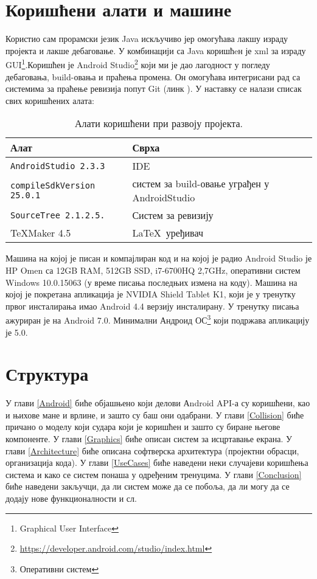 \section{Коришћени алати и машине}
Користио сам прорамски језик Java искључиво јер омогућава лакшу израду пројекта и лакше дебаговање. У комбинацији са Java коришћeн је xml за израду GUI\footnote{Graphical User Interface}.Коришћен је Android Studio\footnote{\url{https://developer.android.com/studio/index.html}} који ми је дао лагодност у погледу дебаговања, build-овања и праћења промена. Он омогућава интегрисани рад са системима за праћење ревизија попут Git (линк \cite{BitBucket}). У наставку се налази списак свих коришћених алата:
\begin{table}[H]\centering
\begin{tabular}{ l  l } \toprule
{\bf Алат} & {\bf Сврха}\\ \midrule
{\tt AndroidStudio 2.3.3} & IDE\\
{\tt compileSdkVersion 25.0.1} & систем за build-овање уграђен у AndroidStudio\\
{\tt SourceTree 2.1.2.5.} & Систем за ревизију\\
\TeX Maker 4.5 & \LaTeX\ уређивач\\
\bottomrule
\end{tabular}
\caption{Алати коришћени при развоју пројекта.} \label{UsedTools}
\end{table}
Машина на којој је писан и компајлиран код и на којој је радио Android Studio је HP Omen са 12GB RAM, 512GB SSD, i7-6700HQ 2,7GHz, оперативни систем Windows 10.0.15063 (у време писања последњих измена на коду). Машина на којој је покретана апликација је NVIDIA Shield Tablet K1, који је у тренутку првог инсталирања имао Android 4.4 верзију инсталирану. У тренутку писања ажуриран је на Android 7.0. Минимални Андроид ОС\footnote{Оперативни систем} који подржава апликацију је 5.0.


\section{Структура}
У глави \ref{Android} биће објашњено који делови Аndroid API-а су коришћени, као и њихове мане и врлине, и зашто су баш они одабрани.
У глави  \ref{Collision} биће причано о моделу који судара који је коришћен и зашто су биране његове компоненте. У глави \ref{Graphics} биће описан систем за исцртавање екрана. У глави \ref{Architecture} биће описана софтверска архитектура (пројектни обрасци, организација кода). У глави \ref{UseCases} биће наведени неки случајеви коришћења система и како се систем понаша у одређеним тренуцима. У глави \ref{Conclusion} биће наведени закључци, да ли систем може да се побоља, да ли могу да се додају нове функционалности и сл.


	